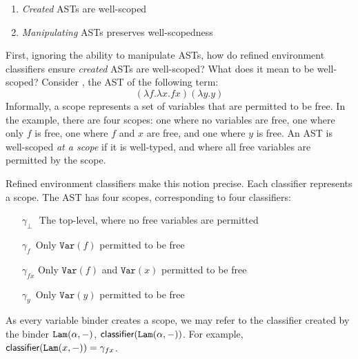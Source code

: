 \begin{enumerate}
  \item \textit{Created} ASTs are well-scoped
  \item \textit{Manipulating} ASTs preserves well-scopedness 
\end{enumerate}

First, ignoring the ability to manipulate ASTs, how do refined environment classifiers ensure \textit{created} ASTs are well-scoped? What does it mean to be well-scoped? Consider , the AST of the following term: 
\[(\lambda f. \lambda x. f x) (\lambda y. y)\]
Informally, a scope represents a set of variables that are permitted to be free. In the example, there are four scopes: one where no variables are free, one where only $f$ is free, one where $f$ and $x$ are free, and one where $y$ is free. An AST is well-scoped \textit{at a scope} if it is well-typed, and where all free variables are permitted by the scope. 

Refined environment classifiers make this notion precise. Each classifier represents a scope. The AST has four scopes, corresponding to four classifiers:
\begin{itemize}
\item[$\gamma_{\bot}$\,\,] The top-level, where no free variables are permitted 
\item[$\gamma_{f}$\;\,] Only $\texttt{Var}(f)$ permitted to be free
\item[$\gamma_{fx}$] Only $\texttt{Var}(f)$ and $\texttt{Var}(x)$ permitted to be free 
\item[$\gamma_{y}$\;\,] Only $\texttt{Var}(y)$ permitted to be free
\end{itemize}
As every variable binder creates a scope, we may refer to the classifier created by the binder $\texttt{Lam}(\alpha, -)$, $\textsf{classifier}(\texttt{Lam}(\alpha, -))$. For example, $\textsf{classifier}(\texttt{Lam}(x, -)) = \gamma_{fx}$.

